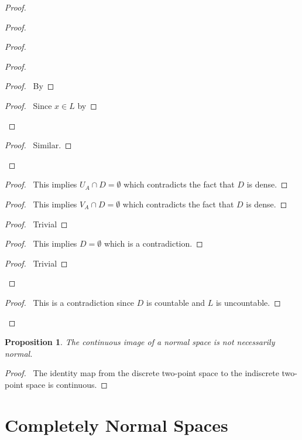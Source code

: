 \documentclass{report}
\let\qed\relax
\newtheorem{prop}[lm]{Proposition}
\theoremstyle{definition}
\begin{document}
\begin{proof}
\begin{proof}
\begin{proof}
\begin{proof}
      \begin{proof}
        \pf\ By 
      \end{proof}
      \begin{proof}
        \pf\ Since $x \in L$ by 
      \end{proof}
    \end{proof}
    \begin{proof}
      \pf\ Similar.
    \end{proof}
  \end{proof}
  \begin{proof}
    \pf\ This implies $U_A \cap D = \emptyset$ which contradicts the fact that
    $D$ is dense.
  \end{proof}
  \begin{proof}
    \pf\ This implies $V_A \cap D = \emptyset$ which contradicts the fact that
    $D$ is dense.
  \end{proof}
  \begin{proof}
    \pf\ Trivial
  \end{proof}
  \begin{proof}
    \pf\ This implies $D = \emptyset$ which is a contradiction.
  \end{proof}
  \begin{proof}
    \pf\ Trivial
  \end{proof}
\end{proof}
\qedstep
\begin{proof}
  \pf\ This is a contradiction since $D$ is countable and $L$ is uncountable.
\end{proof}
  \qed
 \end{proof}

 \begin{prop}
   The continuous image of a normal space is not necessarily normal.
 \end{prop}

 \begin{proof}
   \pf\ The identity map from the discrete two-point space to the indiscrete two-point space is continuous. \qed
 \end{proof}

  \section{Completely Normal Spaces}
\end{document}
